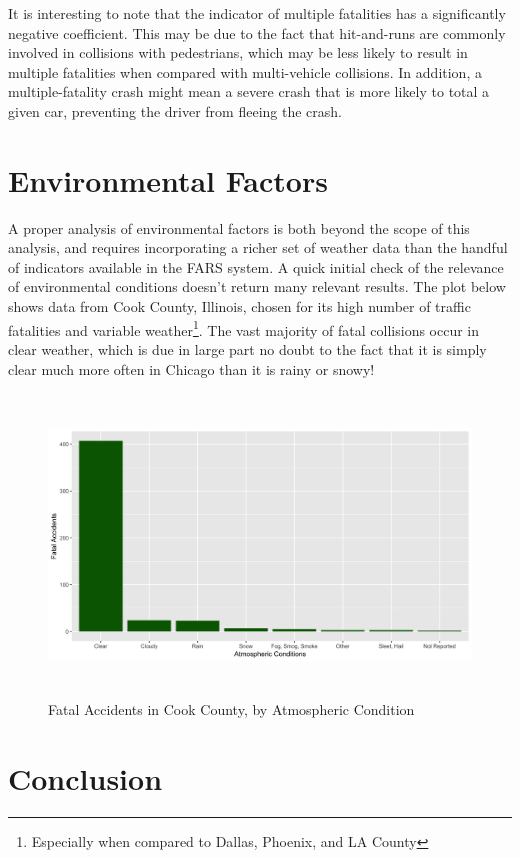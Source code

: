 \documentclass[11pt, oneside,titlepage]{article}   	%
\begin{document}
It is interesting to note that the indicator of multiple fatalities has a significantly negative coefficient. This may be due to the fact that hit-and-runs are commonly involved in collisions with pedestrians, which may be less likely to result in multiple fatalities when compared with multi-vehicle collisions. In addition, a multiple-fatality crash might mean a severe crash that is more likely to total a given car, preventing the driver from fleeing the crash.


\section*{Environmental Factors}
A proper analysis of environmental factors is both beyond the scope of this analysis, and requires incorporating a richer set of weather data than the handful of indicators available in the FARS system. A quick initial check of the relevance of environmental conditions doesn't return many relevant results. The plot below shows data from Cook County, Illinois, chosen for its high number of traffic fatalities and variable weather\footnote{Especially when compared to Dallas, Phoenix, and LA County}. The vast majority of fatal collisions occur in clear weather, which is due in large part no doubt to the fact that it is simply clear much more often in Chicago than it is rainy or snowy! 

\begin{figure}[H]
\centering
  \includegraphics[width=15cm,height=8cm,keepaspectratio]{Environmental.png}
\caption{Fatal Accidents in Cook County, by Atmospheric Condition}
\end{figure}


\section*{Conclusion}
\end{document}
